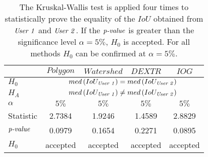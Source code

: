 


\begin{table}[h!]
	\centering
	\begin{tabular}{l|c c c c}
		\toprule 		
							& $ Polygon $	&  $ Watershed $  	&  $ DEXTR $ 	& $ IOG $ \\
		\midrule
		$ H_{0} $			& \multicolumn{4}{c}{$ med \left( IoU_{\textnormal{\textit{User 1}}} \right) = med \left( IoU_{\textnormal{\textit{User 2}}} \right) $ }  \\  
		$ H_{A} $		 	& \multicolumn{4}{c}{$ med \left( IoU_{\textnormal{\textit{User 1}}} \right) \not= med \left( IoU_{\textnormal{\textit{User 2}}} \right) $}  \\ 	
		$ \alpha $		 	& $ 5\% $ 		&  $ 5\% $ 			&  $ 5\% $ 		& $ 5\% $	\\ 	
		Statistic		 	&  2.7384		&  1.9246 			&  1.4589		& 2.8829 	\\ 
		$ \textnormal{\textit{p-value}} $
							& 0.0979		&  0.1654			&  0.2271		& 0.0895	\\
		$ H_{0} $		  	&  accepted 	&  accepted	  		&  accepted 	& accepted  \\ 										
		\bottomrule
	\end{tabular}
	\caption[Kruskal-Wallis on $ IoU $ from two users]{
		The Kruskal-Wallis test is applied four times to statistically prove the equality of the $ IoU $ obtained from $ \textnormal{\textit{User 1}} $ and $ \textnormal{\textit{User 2}} $.
		If the $ \textnormal{\textit{p-value}} $ is greater than the significance level $ \alpha = 5\% $, $ H_{0} $ is accepted.
		For all methods $ H_{0} $ can be confirmed at $ \alpha = 5\% $.	  
	}\label{tab:appendix:afe_cmo_kruskal_wallis_iou}
\end{table}

